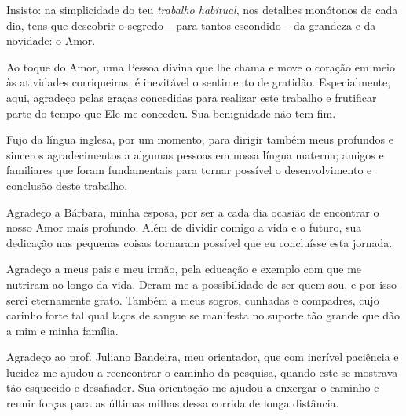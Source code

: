 %

\begin{openingquote}
    Insisto: na simplicidade do teu \emph{trabalho habitual}, nos detalhes monótonos de cada dia, tens que descobrir o segredo -- para tantos escondido -- da grandeza e da novidade: o Amor. \cite[n. 489]{escriva2016sulco}
\end{openingquote}

Ao toque do Amor, uma Pessoa divina que lhe chama e move o cora\c c\~ao em meio \`as atividades corriqueiras, \'e inevit\'avel o sentimento de gratid\~ao. Especialmente, aqui, agrade\c co pelas gra\c cas concedidas para realizar este trabalho e frutificar parte do tempo que Ele me concedeu. Sua benignidade n\~ao tem fim.

Fujo da l\'ingua inglesa, por um momento, para dirigir tamb\'em meus profundos e sinceros agradecimentos a algumas pessoas em nossa l\'ingua materna; amigos e familiares que foram fundamentais para tornar poss\'ivel o desenvolvimento e conclus\~ao deste trabalho.


Agrade\c co a B\'arbara, minha esposa, por ser a cada dia ocasi\~ao de encontrar o nosso Amor mais profundo. Al\'em de dividir comigo a vida e o futuro, sua dedica\c c\~ao nas pequenas coisas tornaram poss\'ivel que eu conclu\'isse esta jornada.

Agrade\c co a meus pais e meu irm\~ao, pela educa\c c\~ao e exemplo com que me nutriram ao longo da vida. Deram-me a possibilidade de ser quem sou, e por isso serei eternamente grato. Tamb\'em a meus sogros, cunhadas e compadres, cujo carinho forte tal qual la\c cos de sangue se manifesta no suporte t\~ao grande que d\~ao a mim e minha fam\'ilia.

Agrade\c co ao prof. Juliano Bandeira, meu orientador, que com incr\'ivel paci\^encia e lucidez me ajudou a reencontrar o caminho da pesquisa, quando este se mostrava t\~ao esquecido e desafiador. Sua orienta\c c\~ao me ajudou a enxergar o caminho e reunir for\c cas para as \'ultimas milhas dessa corrida de longa dist\^ancia.


